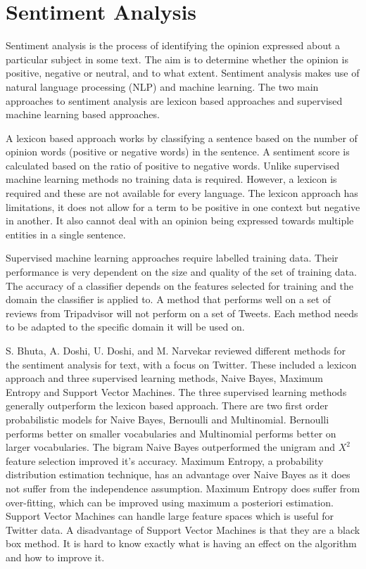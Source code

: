 \section{Sentiment Analysis}

Sentiment analysis is the process of identifying the opinion expressed about a particular subject in some text. The aim is to determine whether the opinion is positive, negative or neutral, and to what extent. Sentiment analysis makes use of natural language processing (NLP) and machine learning. The two main approaches to sentiment analysis are lexicon based approaches and supervised machine learning based approaches. 

A lexicon based approach works by classifying a sentence based on the number of opinion words (positive or negative words) in the sentence. A sentiment score is calculated based on the ratio of positive to negative words. Unlike supervised machine learning methods no training data is required. However, a lexicon is required and these are not available for every language. The lexicon approach has limitations, it does not allow for a term to be positive in one context but negative in another. It also cannot deal with an opinion being expressed towards multiple entities in a single sentence.

Supervised machine learning approaches require labelled training data. Their performance is very dependent on the size and quality of the set of training data. The accuracy of a classifier depends on the features selected for training and the domain the classifier is applied to. A method that performs well on a set of reviews from Tripadvisor will not perform on a set of Tweets. Each method needs to be adapted to the specific domain it will be used on.

S. Bhuta, A. Doshi, U. Doshi, and M. Narvekar \cite{Bhuta2014} reviewed different methods for the sentiment analysis for text, with a focus on Twitter. These included a lexicon approach and three supervised learning methods, Naive Bayes, Maximum Entropy and Support Vector Machines. The three supervised learning methods generally outperform the lexicon based approach. There are two first order probabilistic models for Naive Bayes, Bernoulli and Multinomial. Bernoulli performs better on smaller vocabularies and Multinomial performs better on larger vocabularies. The bigram Naive Bayes outperformed the unigram and ${X}^2$ feature selection improved it's accuracy. Maximum Entropy, a probability distribution estimation technique, has an advantage over Naive Bayes as it does not suffer from the independence assumption. Maximum Entropy does suffer from over-fitting, which can be improved using maximum a posteriori estimation. Support Vector Machines can handle large feature spaces which is useful for Twitter data. A disadvantage of Support Vector Machines is that they are a black box method. It is hard to know exactly what is having an effect on the algorithm and how to improve it.

